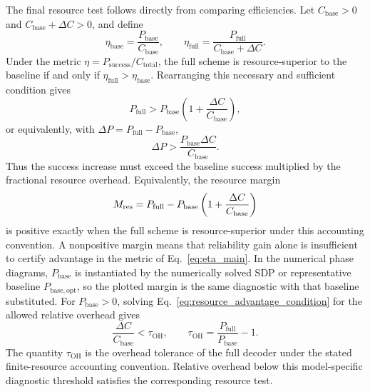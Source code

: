 The final resource test follows directly from comparing efficiencies. Let $C_{\mathrm{base}}>0$ and $C_{\mathrm{base}}+\Delta C>0$, and define
\begin{equation}
    \eta_{\mathrm{base}}=\frac{P_{\mathrm{base}}}{C_{\mathrm{base}}},
    \qquad
    \eta_{\mathrm{full}}=\frac{P_{\mathrm{full}}}{C_{\mathrm{base}}+\Delta C}.
    \label{eq:eta_base_full_derivation}
\end{equation}
Under the metric \(\eta=P_{\mathrm{success}}/C_{\mathrm{total}}\), the full scheme is resource-superior to the baseline if and only if
\(\eta_{\mathrm{full}}>\eta_{\mathrm{base}}\). Rearranging this necessary and sufficient condition gives
\begin{equation}
    P_{\mathrm{full}}>P_{\mathrm{base}}\left(1+\frac{\Delta C}{C_{\mathrm{base}}}\right),
    \label{eq:resource_advantage_condition}
\end{equation}
or equivalently, with \(\Delta P=P_{\mathrm{full}}-P_{\mathrm{base}}\),
\begin{equation}
    \Delta P>\frac{P_{\mathrm{base}}\Delta C}{C_{\mathrm{base}}}.
    \label{eq:delta_p_resource_condition}
\end{equation}
Thus the success increase must exceed the baseline success multiplied by the fractional resource overhead.
Equivalently, the resource margin
\begin{equation}
    M_{\rm res}
    =
    P_{\mathrm{full}}
    -
    P_{\mathrm{base}}
    \left(1+\frac{\Delta C}{C_{\mathrm{base}}}\right)
    \label{eq:resource_margin_main}
\end{equation}
is positive exactly when the full scheme is resource-superior under this accounting convention. A nonpositive margin means that reliability gain alone is insufficient to certify advantage in the metric of Eq.~\eqref{eq:eta_main}. In the numerical phase diagrams, \(P_{\mathrm{base}}\) is instantiated by the numerically solved SDP or representative baseline \(P_{\mathrm{base,opt}}\), so the plotted margin is the same diagnostic with that baseline substituted.
For \(P_{\mathrm{base}}>0\), solving Eq.~\eqref{eq:resource_advantage_condition} for the allowed relative overhead gives
\begin{equation}
    \frac{\Delta C}{C_{\mathrm{base}}}
    <
    \tau_{\mathrm{OH}},
    \qquad
    \tau_{\mathrm{OH}}
    =
    \frac{P_{\mathrm{full}}}{P_{\mathrm{base}}}-1 .
    \label{eq:overhead_tolerance}
\end{equation}
The quantity \(\tau_{\mathrm{OH}}\) is the overhead tolerance of the full decoder under the stated finite-resource accounting convention. Relative overhead below this model-specific diagnostic threshold satisfies the corresponding resource test.

